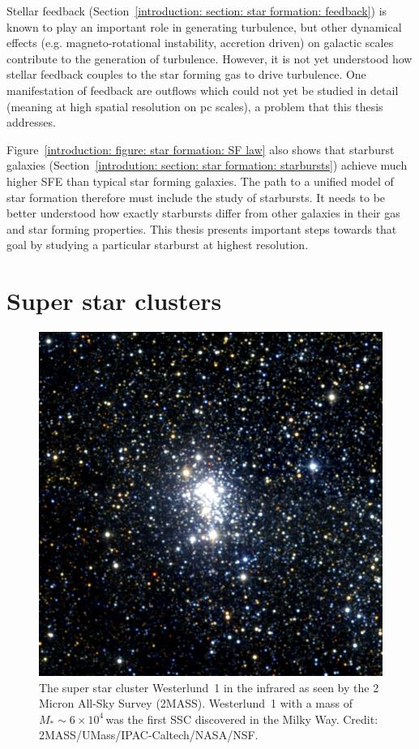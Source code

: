 Stellar feedback (Section~\ref{introduction: section: star formation: feedback}) is known to play an important role in generating turbulence, but other dynamical effects (e.g. magneto-rotational instability, accretion driven) on galactic scales contribute to the generation of turbulence\citep[e.g.][]{2019ApJ...871...17U}.
However, it is not yet understood how stellar feedback couples to the star forming gas to drive turbulence. One manifestation of feedback are outflows which could not yet be studied in detail (meaning at high spatial resolution on pc scales), a problem that this thesis addresses.

Figure~\ref{introduction: figure: star formation: SF law} also shows that starburst galaxies (Section~\ref{introdution: section: star formation: starbursts}) achieve much higher SFE than typical star forming galaxies. The path to a unified model of star formation therefore must include the study of starbursts. It needs to be better understood how exactly starbursts differ from other galaxies in their gas and star forming properties. This thesis presents important steps towards that goal by studying a particular starburst at highest resolution.



\section{Super star clusters}
\label{introduction: section: star formation: SSCs}

\begin{figure}[t]
	\centering
	\includegraphics[width=0.6\linewidth]{images/chapters/introduction/sf/westerlund1_IR.jpg}
	\caption[Super star cluster Westerlund 1]{The super star cluster Westerlund~1 in the infrared as seen by the 2 Micron All-Sky Survey (2MASS). Westerlund~1 with a mass of $M_\ast \sim 6\times10^4$\,\Msun was the first SSC discovered in the Milky Way. Credit: 2MASS/UMass/IPAC-Caltech/NASA/NSF.}
	\label{introduction: figure: star formation: SSC example}
\end{figure}

